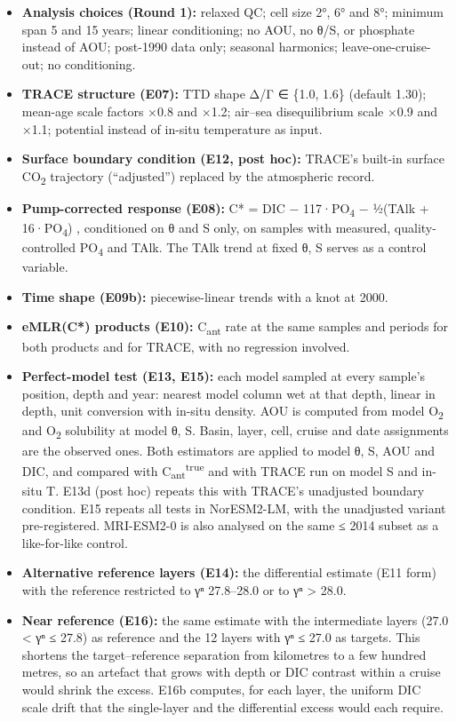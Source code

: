 \documentclass[11pt]{article}
\providecommand{\tightlist}{\setlength{\itemsep}{0pt}\setlength{\parskip}{0pt}}
\begin{document}
\begin{itemize}
\tightlist
\item
  \textbf{Analysis choices (Round 1):} relaxed QC; cell size 2°, 6° and
  8°; minimum span 5 and 15 years; linear conditioning; no AOU, no θ/S,
  or phosphate instead of AOU; post-1990 data only; seasonal harmonics;
  leave-one-cruise-out; no conditioning.
\item
  \textbf{TRACE structure (E07):} TTD shape Δ/Γ ∈ \{1.0, 1.6\} (default
  1.30); mean-age scale factors ×0.8 and ×1.2; air--sea disequilibrium
  scale ×0.9 and ×1.1; potential instead of in-situ temperature as
  input.
\item
  \textbf{Surface boundary condition (E12, post hoc):} TRACE's built-in
  surface CO\textsubscript{2} trajectory (``adjusted'') replaced by the
  atmospheric record.
\item
  \textbf{Pump-corrected response (E08):} C* = DIC −
  117·PO\textsubscript{4} − ½(TAlk + 16·PO\textsubscript{4})
  \citep{Gruber1996}, conditioned on θ and S only, on samples with
  measured, quality-controlled PO\textsubscript{4} and TAlk. The TAlk
  trend at fixed θ, S serves as a control variable.
\item
  \textbf{Time shape (E09b):} piecewise-linear trends with a knot at
  2000.
\item
  \textbf{eMLR(C*) products (E10):} C\textsubscript{ant} rate at the
  same samples and periods for both products and for TRACE, with no
  regression involved.
\item
  \textbf{Perfect-model test (E13, E15):} each model sampled at every
  sample's position, depth and year: nearest model column wet at that
  depth, linear in depth, unit conversion with in-situ density. AOU is
  computed from model O\textsubscript{2} and O\textsubscript{2}
  solubility at model θ, S. Basin, layer, cell, cruise and date
  assignments are the observed ones. Both estimators are applied to
  model θ, S, AOU and DIC, and compared with
  C\textsubscript{ant}\textsuperscript{true} and with TRACE run on model
  S and in-situ T. E13d (post hoc) repeats this with TRACE's unadjusted
  boundary condition. E15 repeats all tests in NorESM2-LM, with the
  unadjusted variant pre-registered. MRI-ESM2-0 is also analysed on the
  same ≤ 2014 subset as a like-for-like control.
\item
  \textbf{Alternative reference layers (E14):} the differential estimate
  (E11 form) with the reference restricted to γⁿ 27.8--28.0 or to γⁿ
  \textgreater{} 28.0.
\item
  \textbf{Near reference (E16):} the same estimate with the intermediate
  layers (27.0 \textless{} γⁿ ≤ 27.8) as reference and the 12 layers
  with γⁿ ≤ 27.0 as targets. This shortens the target--reference
  separation from kilometres to a few hundred metres, so an artefact
  that grows with depth or DIC contrast within a cruise would shrink the
  excess. E16b computes, for each layer, the uniform DIC scale drift
  that the single-layer and the differential excess would each require.
\end{itemize}
\end{document}
